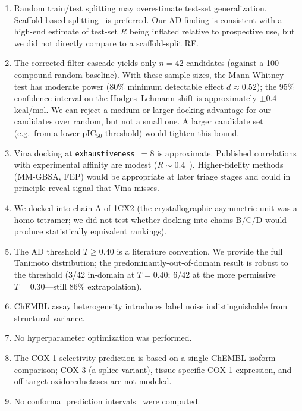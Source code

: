 \documentclass[11pt]{article}
\begin{document}
\begin{enumerate}
\item Random train/test splitting may overestimate test-set generalization. Scaffold-based splitting~\cite{martin2017} is preferred. Our AD finding is consistent with a high-end estimate of test-set $R$ being inflated relative to prospective use, but we did not directly compare to a scaffold-split RF.

\item The corrected filter cascade yields only $n=42$ candidates (against a 100-compound random baseline). With these sample sizes, the Mann-Whitney test has moderate power (80\% minimum detectable effect $d \approx 0.52$); the 95\% confidence interval on the Hodges--Lehmann shift is approximately $\pm 0.4$ kcal/mol. We can reject a medium-or-larger docking advantage for our candidates over random, but not a small one. A larger candidate set (e.g.\ from a lower pIC$_{50}$ threshold) would tighten this bound.

\item Vina docking at \texttt{exhaustiveness}~$=8$ is approximate. Published correlations with experimental affinity are modest ($R \sim 0.4$~\cite{wang2016, gaillard2018}). Higher-fidelity methods (MM-GBSA, FEP) would be appropriate at later triage stages and could in principle reveal signal that Vina misses.

\item We docked into chain A of 1CX2 (the crystallographic asymmetric unit was a homo-tetramer; we did not test whether docking into chains B/C/D would produce statistically equivalent rankings).

\item The AD threshold $T \geq 0.40$ is a literature convention. We provide the full Tanimoto distribution; the predominantly-out-of-domain result is robust to the threshold (3/42 in-domain at $T = 0.40$; 6/42 at the more permissive $T = 0.30$---still 86\% extrapolation).

\item ChEMBL assay heterogeneity introduces label noise indistinguishable from structural variance.

\item No hyperparameter optimization was performed.

\item The COX-1 selectivity prediction is based on a single ChEMBL isoform comparison; COX-3 (a splice variant), tissue-specific COX-1 expression, and off-target oxidoreductases are not modeled.

\item No conformal prediction intervals~\cite{cortes2019} were computed.
\end{enumerate}
\end{document}
